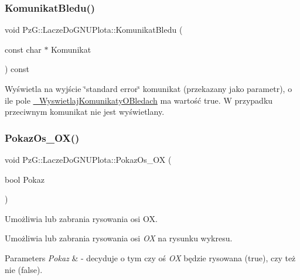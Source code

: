 \subsubsection{\texorpdfstring{Komunikat\+Bledu()}{KomunikatBledu()}}
{\footnotesize\ttfamily void Pz\+G\+::\+Lacze\+Do\+G\+N\+U\+Plota\+::\+Komunikat\+Bledu (\begin{DoxyParamCaption}\item[{const char $\ast$}]{Komunikat }\end{DoxyParamCaption}) const\hspace{0.3cm}{\ttfamily [protected]}}

Wyświetla na wyjście \char`\"{}standard error\char`\"{} komunikat (przekazany jako parametr), o ile pole \hyperlink{classPzG_1_1LaczeDoGNUPlota_a2f2800f14ebfe1caef0b4d30c410a7fe}{\+\_\+\+Wyswietlaj\+Komunikaty\+O\+Bledach} ma wartość {\ttfamily true}. W przypadku przeciwnym komunikat nie jest wyświetlany. \mbox{\label{classPzG_1_1LaczeDoGNUPlota_a11421d7c67deab6b7524cc492407e897}} 
\subsubsection{\texorpdfstring{Pokaz\+Os\+\_\+\+O\+X()}{PokazOs\_OX()}\hspace{0.1cm}{\footnotesize\ttfamily [1/2]}}
{\footnotesize\ttfamily void Pz\+G\+::\+Lacze\+Do\+G\+N\+U\+Plota\+::\+Pokaz\+Os\+\_\+\+OX (\begin{DoxyParamCaption}\item[{bool}]{Pokaz }\end{DoxyParamCaption})\hspace{0.3cm}{\ttfamily [inline]}}



Umożliwia lub zabrania rysowania osi OX. 

Umożliwia lub zabrania rysowania osi {\itshape OX} na rysunku wykresu. 
\begin{DoxyParams}{Parameters}
{\em Pokaz} & -\/ decyduje o tym czy oś {\itshape OX} będzie rysowana ({\ttfamily true}), czy też nie ({\ttfamily false}). \\
\hline
\end{DoxyParams}
\mbox{\label{classPzG_1_1LaczeDoGNUPlota_ae112972af57167c3b053bf922bce6bbf}} 
